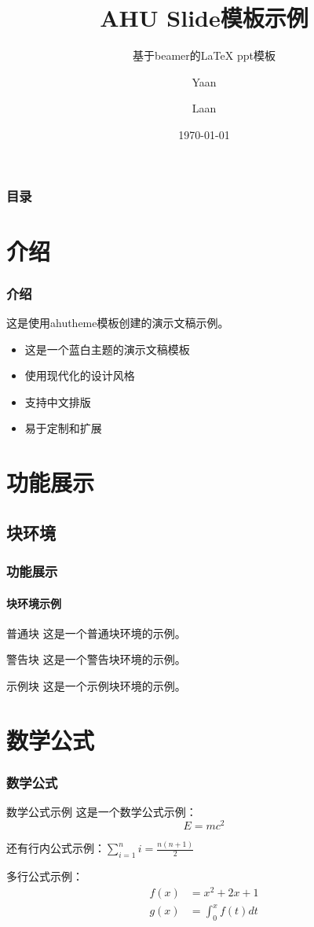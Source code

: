 \documentclass[10pt]{beamer}
\title{AHU Slide模板示例}
\subtitle{基于beamer的\LaTeX{} ppt模板}
\author{Yaan \and Laan}
\institute{Anhui University}
\date{\today}
\begin{document}
\begingroup
{}
\begin{frame}
\titlepage
\end{frame}
\endgroup

\begin{frame}
\frametitle{目录}
\tableofcontents
\end{frame}

\section{介绍}
\begin{frame}
\frametitle{介绍}
这是使用ahutheme模板创建的演示文稿示例。

\begin{itemize}
  \item 这是一个蓝白主题的演示文稿模板
  \item 使用现代化的设计风格
  \item 支持中文排版
  \item 易于定制和扩展
\end{itemize}
\end{frame}

\section{功能展示}
\subsection{块环境}
\begin{frame}
\frametitle{功能展示}
\framesubtitle{块环境示例}

\begin{block}{普通块}
这是一个普通块环境的示例。
\end{block}

\begin{alertblock}{警告块}
这是一个警告块环境的示例。
\end{alertblock}

\begin{exampleblock}{示例块}
这是一个示例块环境的示例。
\end{exampleblock}
\end{frame}

\section{数学公式}
\begin{frame}
\frametitle{数学公式}

\begin{block}{数学公式示例}
这是一个数学公式示例：
\[ E = mc^2 \]

还有行内公式示例：$\sum_{i=1}^{n} i = \frac{n(n+1)}{2}$

多行公式示例：
\begin{align}
  f(x) &= x^2 + 2x + 1 \\
  g(x) &= \int_0^x f(t) dt
\end{align}

\end{block}

\end{frame}
\end{document}
